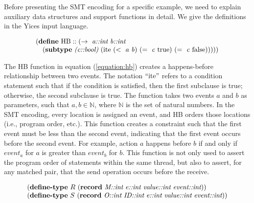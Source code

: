 Before presenting the SMT encoding for a specific example, we need to explain auxiliary data structures and support functions in detail. We give the definitions in the Yices input language.

\begin{equation}
\begin{array}{l}
(\textbf{define}\ \mathrm{HB}::(\rightarrow\ \emph{a::int}\ \emph{b::int}\\
\ \ \ (\textbf{subtype}\ \emph{(c::bool)}\ (\mathrm{ite}\ (<\ \mathit{a}\ \mathit{b})\ (=\ \mathit{c}\ \mathrm{true})\ (=\ \mathit{c}\ \mathrm{false})))))
\end{array}
\label{equation:hb}
\end{equation}


The HB function in equation (\ref{equation:hb}) creates a happens-before relationship between two events. The notation $``\mathrm{ite}"$ refers to a condition statement such that if the condition is satisfied, then the first subclause is true; otherwise, the second subclause is true. The function takes two events $a$ and $b$ as parameters, such that $a,b \in \mathbb{N}$, where $\mathbb{N}$ is the set of natural numbers. In the SMT encoding, every location is assigned an event, and HB orders those locations (i.e., program order, etc.). This function creates a constraint such that the first event must be less than the second event, indicating that the first event occurs before the second event. For example, action $a$ happens before $b$ if and only if $\mathit{event}_a$ for $a$ is greater than $\mathit{event}_b$ for $b$. This function is not only used to assert the program order of statements within the same thread, but also to assert, for any matched pair, that the send operation
occurs before the receive.

\begin{equation}
\begin{array}{l}
(\textbf{define-type}\ R\ (\textbf{record}\ \emph{M::int}\ \emph{e::int}\ \emph{value::int}\ \emph{event::int})) \\
(\textbf{define-type}\ S\ (\textbf{record}\ \emph{O::int}\ \emph{ID::int}\ \emph{e::int}\ \emph{value::int}\ \emph{event::int}))
\end{array}
\label{equation:record}
\end{equation}

